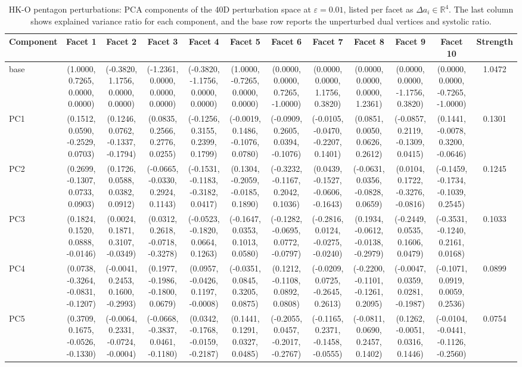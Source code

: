 \begin{table}[p]
\centering
\scriptsize
\setlength{\tabcolsep}{2pt}
\renewcommand{\arraystretch}{1.1}
\begin{tabular}{lccccccccccc}
\toprule
 Component & Facet 1 & Facet 2 & Facet 3 & Facet 4 & Facet 5 & Facet 6 & Facet 7 & Facet 8 & Facet 9 & Facet 10 & Strength \\
\midrule
 base & (1.0000, 0.7265, 0.0000, 0.0000) & (-0.3820, 1.1756, 0.0000, 0.0000) & (-1.2361, 0.0000, 0.0000, 0.0000) & (-0.3820, -1.1756, 0.0000, 0.0000) & (1.0000, -0.7265, 0.0000, 0.0000) & (0.0000, 0.0000, 0.7265, -1.0000) & (0.0000, 0.0000, 1.1756, 0.3820) & (0.0000, 0.0000, 0.0000, 1.2361) & (0.0000, 0.0000, -1.1756, 0.3820) & (0.0000, 0.0000, -0.7265, -1.0000) & 1.0472 \\
 PC1 & (0.1512, 0.0590, -0.2529, 0.0703) & (0.1246, 0.0762, -0.1337, -0.1794) & (0.0835, 0.2566, 0.2776, 0.0255) & (-0.1256, 0.3155, 0.2399, 0.1799) & (-0.0019, 0.1486, -0.1076, 0.0780) & (-0.0909, 0.2605, 0.0394, -0.1076) & (-0.0105, -0.0470, -0.2207, 0.1401) & (0.0851, 0.0050, 0.0626, 0.2612) & (-0.0857, 0.2119, -0.1309, 0.0415) & (0.1441, -0.0078, 0.3200, -0.0646) & 0.1301 \\
 PC2 & (0.2699, -0.1307, 0.0733, 0.0903) & (0.1726, 0.0588, 0.0382, 0.0912) & (-0.0665, -0.0330, 0.2924, 0.1143) & (-0.1531, -0.1183, -0.3182, 0.0417) & (0.1304, -0.2059, -0.0185, 0.1890) & (-0.3232, -0.1167, 0.2042, 0.1036) & (0.0439, -0.1527, -0.0606, -0.1643) & (-0.0631, 0.0356, -0.0828, 0.0659) & (0.0104, 0.1722, -0.3276, -0.0816) & (-0.1459, -0.1734, -0.1039, 0.2545) & 0.1245 \\
 PC3 & (0.1824, 0.1520, 0.0888, -0.0146) & (0.0024, 0.1871, 0.3107, -0.0349) & (0.0312, 0.2618, -0.0718, -0.3278) & (-0.0523, -0.1820, 0.0664, 0.1263) & (-0.1647, 0.0353, 0.1013, 0.0580) & (-0.1282, -0.0695, 0.0772, -0.0797) & (-0.2816, 0.0124, -0.0275, -0.0240) & (0.1934, -0.0612, -0.0138, -0.2979) & (-0.2449, 0.0535, 0.1606, 0.0479) & (-0.3531, -0.1240, 0.2161, 0.0168) & 0.1033 \\
 PC4 & (0.0738, -0.3264, -0.0831, -0.1207) & (-0.0041, 0.2453, 0.1600, -0.2993) & (0.1977, -0.1986, -0.1800, 0.0679) & (0.0957, -0.0426, 0.1197, -0.0008) & (-0.0351, 0.0845, 0.3205, 0.0875) & (0.1212, -0.1108, 0.0892, 0.0808) & (-0.0209, 0.0725, -0.2645, 0.2613) & (-0.2200, -0.1101, -0.1261, 0.2095) & (-0.0047, 0.0359, 0.0281, -0.1987) & (-0.1071, 0.0919, 0.0059, 0.2536) & 0.0899 \\
 PC5 & (0.3709, 0.1675, -0.0526, -0.1330) & (-0.0064, 0.2331, -0.0724, -0.0004) & (-0.0668, -0.3837, 0.0461, -0.1180) & (0.0342, -0.1768, -0.0159, -0.2187) & (0.1441, 0.1291, 0.0327, 0.0485) & (-0.2055, 0.0457, -0.2017, -0.2767) & (-0.1165, 0.2371, -0.1458, -0.0555) & (-0.0811, 0.0690, 0.2457, 0.1402) & (0.1262, -0.0051, 0.0316, 0.1446) & (-0.0104, -0.0441, -0.1126, -0.2560) & 0.0754 \\
\bottomrule
\end{tabular}
\caption{HK-O pentagon perturbations: PCA components of the 40D perturbation space at $\varepsilon = 0.01$, listed per facet as $\Delta a_i \in \mathbb{R}^4$. The last column shows explained variance ratio for each component, and the base row reports the unperturbed dual vertices and systolic ratio.}
\label{tab:pentagon-perturb-pca}
\end{table}

